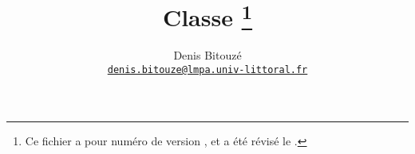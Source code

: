 \title{Classe \yat\thanks{Ce fichier a pour numéro de version \fileversion, et
    a été révisé le \filedate.}%
}
%
\author{%
  Denis Bitouzé\\
  \texorpdfstring{%
    \href{mailto:denis.bitouze@lmpa.univ-littoral.fr}%
    {\nolinkurl{denis.bitouze@lmpa.univ-littoral.fr}}%
  }{%
    denis.bitouze@lmpa.univ-littoral.fr%
  }%
}
%
\maketitle

\iffalse
\fi
